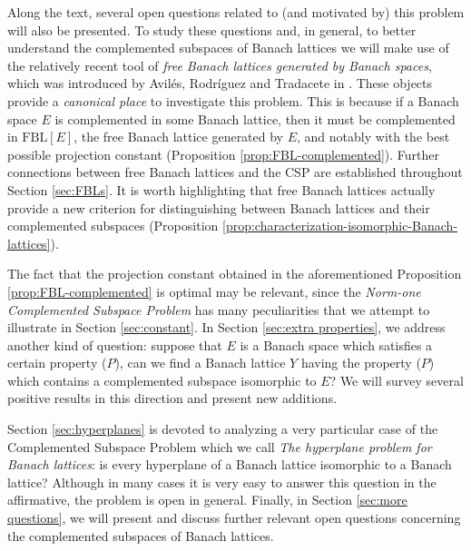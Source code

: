 \documentclass[11pt]{amsart}
\theoremstyle{definition}
\numberwithin{equation}{section}
\newcommand{\fbl}{\text{FBL}}
\begin{document}
Along the text, several open questions related to (and motivated by) this problem will also be presented. To study these questions and, in general, to better understand the complemented subspaces of Banach lattices we will make use of the relatively recent tool of \textit{free Banach lattices generated by Banach spaces}, which was introduced by Avilés, Rodríguez and Tradacete in \cite{ART18}. These objects provide a \textit{canonical place} to investigate this problem. This is because if a Banach space $E$ is complemented in some Banach lattice, then it must be complemented in $\fbl[E]$, the free Banach lattice generated by $E$, and notably with the best possible projection constant (Proposition \ref{prop:FBL-complemented}). Further connections between free Banach lattices and the CSP are established throughout Section \ref{sec:FBLs}. It is worth highlighting that free Banach lattices actually provide a new criterion for distinguishing between Banach lattices and their complemented subspaces (Proposition \ref{prop:characterization-isomorphic-Banach-lattices}).

The fact that the projection constant obtained in the aforementioned Proposition \ref{prop:FBL-complemented} is optimal may be relevant, since the \textit{Norm-one Complemented Subspace Problem} has many peculiarities that we attempt to illustrate in Section \ref{sec:constant}. In Section \ref{sec:extra properties}, we address another kind of question: suppose that $E$ is a Banach space which satisfies a certain property ($P$), can we find a Banach lattice $Y$ having the property ($P$) which contains a complemented subspace isomorphic to $E$? We will survey several positive results in this direction and present new additions. 


Section \ref{sec:hyperplanes} is devoted to analyzing a very particular case of the Complemented Subspace Problem which we call \textit{The hyperplane problem for Banach lattices}: is every hyperplane of a Banach lattice isomorphic to a Banach lattice? Although in many cases it is very easy to answer this question in the affirmative, the problem is open in general. Finally, in Section \ref{sec:more questions}, we will present and discuss further relevant open questions concerning the complemented subspaces of Banach lattices.











\end{document}
